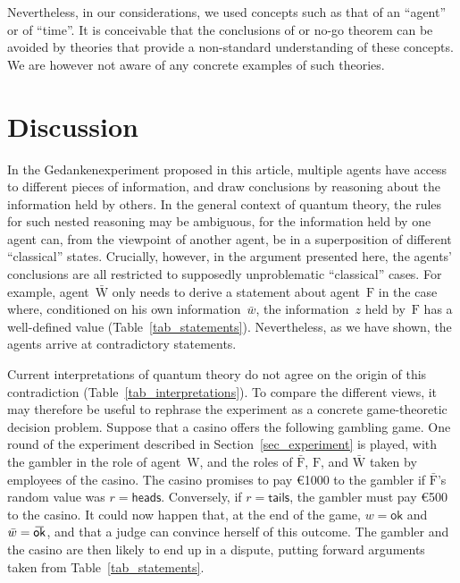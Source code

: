 \documentclass[12pt]{article}
\theoremstyle{mystyle}
\theoremstyle{definition}
\newcommand{\oline}[2]{{\mkern#2mu\overline{\protect\vphantom{t}\mkern-#2mu\smash{#1}\mkern-#2mu}\mkern#2mu}}
\newcommand*{\Friendone}{\mathrm{\bar{F}}}
\newcommand*{\Friendtwo}{\mathrm{F}}
\newcommand*{\Assistant}{\mathrm{\bar{W}}}
\newcommand*{\Wigner}{\mathrm{W}}
\newcommand*{\wb}{\bar{w}}
\newcommand*{\ok}{\mathsf{ok}}
\newcommand*{\okb}{\oline{\ok}{2.8}}
\newcommand*{\head}{\mathsf{heads}}
\newcommand*{\tail}{\mathsf{tails}}
\begin{document}
Nevertheless, in our considerations, we used concepts such as that of an ``agent'' or of ``time''. It is conceivable that the conclusions of or no-go theorem can be avoided by theories that provide a non-standard understanding of these concepts. We are however not aware of any concrete examples of such theories. 


\section{Discussion} \label{sec_discussion}

In the Gedankenexperiment proposed in this article, multiple agents have access to different pieces of information, and draw conclusions by reasoning about the information held by others. In the general context of quantum theory, the rules for such nested reasoning may be ambiguous, for the information held by one agent can, from the viewpoint of another agent, be in a superposition of different ``classical'' states. Crucially, however,  in the argument presented here, the agents' conclusions are all restricted to  supposedly unproblematic ``classical'' cases. For example, agent~$\Assistant$ only needs to derive a statement about agent~$\Friendtwo$ in the case where, conditioned on his own information~$\wb$, the information~$z$ held by~$\Friendtwo$ has a well-defined value  (Table~\ref{tab_statements}). Nevertheless, as we have shown, the agents arrive at contradictory statements.

Current interpretations of quantum theory do not agree on the origin of this contradiction (Table~\ref{tab_interpretations}). To compare the different views, it may therefore be useful to rephrase the experiment as a concrete game-theoretic decision problem.  Suppose that a casino offers the following gambling game.  One round of the experiment described in Section~\ref{sec_experiment} is played, with the gambler in the role of agent~$\Wigner$, and the roles of $\Friendone$, $\Friendtwo$, and $\Assistant$ taken by employees of the casino. The casino promises to pay \euro{1000} to the gambler if  $\Friendone$'s random value was $r=\head$. Conversely, if $r=\tail$, the gambler must pay \euro{500} to the casino.  It could now happen that, at the end of the game, $w=\ok$ and $\wb=\okb$, and that a judge can convince herself of this outcome. The gambler and the casino are then likely to end up in a dispute, putting forward arguments taken from Table~\ref{tab_statements}.

\smallskip
\end{document}
